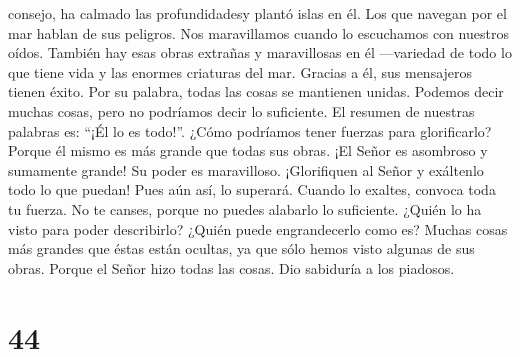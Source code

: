 consejo, ha calmado las profundidadesy plantó islas en él.
 Los que navegan por el mar hablan de sus peligros. Nos
maravillamos cuando lo escuchamos con nuestros oídos. 
También hay esas obras extrañas y maravillosas en él ---variedad de todo
lo que tiene vida y las enormes criaturas del mar. 
Gracias a él, sus mensajeros tienen éxito. Por su palabra, todas las
cosas se mantienen unidas.  Podemos decir muchas cosas,
pero no podríamos decir lo suficiente. El resumen de nuestras palabras
es: ``¡Él lo es todo!''.  ¿Cómo podríamos tener fuerzas
para glorificarlo? Porque él mismo es más grande que todas sus obras.
 ¡El Señor es asombroso y sumamente grande! Su poder es
maravilloso.  ¡Glorifiquen al Señor y exáltenlo todo lo
que puedan! Pues aún así, lo superará. Cuando lo exaltes, convoca toda
tu fuerza. No te canses, porque no puedes alabarlo lo suficiente.
 ¿Quién lo ha visto para poder describirlo? ¿Quién puede
engrandecerlo como es?  Muchas cosas más grandes que
éstas están ocultas, ya que sólo hemos visto algunas de sus obras.
 Porque el Señor hizo todas las cosas. Dio sabiduría a
los piadosos.

\hypertarget{section-43}{%
\section{44}\label{section-43}}

